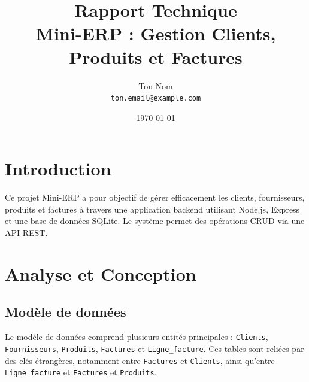 \documentclass[a4paper,12pt]{article}
\title{Rapport Technique \\ Mini-ERP : Gestion Clients, Produits et Factures}
\author{Ton Nom \\ \texttt{ton.email@example.com}}
\date{\today}
\begin{document}
\maketitle

\tableofcontents
\newpage

\section{Introduction}

Ce projet Mini-ERP a pour objectif de gérer efficacement les clients, fournisseurs, produits et factures à travers une application backend utilisant Node.js, Express et une base de données SQLite. Le système permet des opérations CRUD via une API REST.

\section{Analyse et Conception}

\subsection{Modèle de données}

Le modèle de données comprend plusieurs entités principales : \texttt{Clients}, \texttt{Fournisseurs}, \texttt{Produits}, \texttt{Factures} et \texttt{Ligne\_facture}. Ces tables sont reliées par des clés étrangères, notamment entre \texttt{Factures} et \texttt{Clients}, ainsi qu'entre \texttt{Ligne\_facture} et \texttt{Factures} et \texttt{Produits}.
\end{document}
